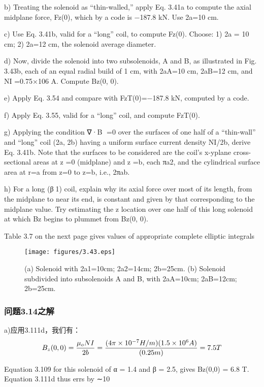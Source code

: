 b) Treating the solenoid as “thin-walled,” apply Eq. 3.41a to compute the axial
midplane force, Fz(0), which by a code is −187.8 kN. Use 2a=10 cm.

c) Use Eq. 3.41b, valid for a “long” coil, to compute Fz(0). Choose: 1) 2a =
10 cm; 2) 2a=12 cm, the solenoid average diameter.

d) Now, divide the solenoid into two subsolenoids, A and B, as illustrated in
Fig. 3.43b, each of an equal radial build of 1 cm, with 2aA=10 cm, 2aB=12 cm,
and NI =0.75×106 A. Compute Bz(0, 0).

e) Apply Eq. 3.54 and compare with FzT(0)=−187.8 kN, computed by a code.

f) Apply Eq. 3.55, valid for a “long” coil, and compute FzT(0).

g) Applying the condition ∇·B =0 over the surfaces of one half of a “thin-wall”
and “long” coil (2a, 2b) having a uniform surface current density NI/2b,
derive Eq. 3.41b. Note that the surfaces to be considered are the coil’s x-yplane cross-sectional areas at z =0 (midplane) and z =b, each πa2, and the
cylindrical surface area at r=a from z=0 to z=b, i.e., 2πab.

h) For a long (β1) coil, explain why its axial force over most of its length, from
the midplane to near its end, is constant and given by that corresponding to
the midplane value. Try estimating the z location over one half of this long
solenoid at which Bz begins to plummet from Bz(0, 0).

Table 3.7 on the next page gives values of appropriate complete elliptic integrals

\begin{figure}[htbp]
	\centering
	\texttt{[image: figures/3.43.eps]}
	\caption{(a) Solenoid with 2a1=10cm; 2a2=14cm; 2b=25cm. (b) Solenoid subdivided
		into subsolenoids A and B, with 2aA=10cm; 2aB=12cm; 2b=25cm.}
\end{figure}


\subsubsection{问题3.14之解}


a)应用3.111d，我们有：
$$
B_{z}(0,0)=\frac{\mu_{o}NI}{2b}\\%
=\frac{(4\pi\times10^{-7}H/m)(1.5\times10^{6}A)}{(0.25m)}=7.5T\\
$$

Equation 3.109 for this solenoid of α = 1.4 and β = 2.5, gives Bz(0,0) = 6.8 T.
Equation 3.111d thus errs by ∼10%

